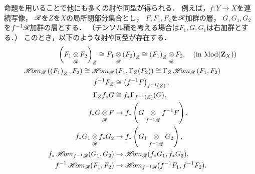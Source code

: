 \begin{RMK}
    命題を用いることで他にも多くの射や同型が得られる．
    例えば，\(f\colon Y\to X\)を連続写像，
    \(\mathscr{R}\)を\(Z\)を\(X\)の局所閉部分集合とし，
    \(F,F_1,F_2\)を\(\mathscr{R}\)加群の層，
    \(G,G_1,G_2\)を\(f^{-1}\mathscr{R}\)加群の層とする．
    （テンソル積を考える場合は\(F_1,G,G_1\)は右加群とする．）
    このとき，以下のような射や同型が存在する．
    \begin{align}
        \left(F_{1}\ttens[\scR]F_{2}\right)_{Z}
        \cong
        F_{1}&\ttens[\scR]\left(F_{2}\right)_{Z}
        \cong
        \left(F_{1}\right)_{Z}\ttens[\scR]F_{2},\quad (\text{in \(\Mod(\zz_X)\)})\label{eq2317}\\
        \HOM_{\scR}\left(\left(F_{1}\right)_{Z},F_{2}\right)
        \cong
        \HOM_{\scR}&\left(F_{1},\Gamma_{Z}(F_{2})\right)
        \cong
        \Gamma_{Z}\HOM_{\scR}\left(F_{1},F_{2}\right)\label{eq2318}\\
        f^{-1}F_{Z}&\cong\left(f^{-1}F\right)_{f^{-1}(Z)},\label{eq2319}\\
        \Gamma_{Z}f_{\ast}G&\cong f_{\ast}\Gamma_{f^{-1}(Z)}(G),\label{eq2320}\\
        f_{\ast}G\ttens[\scR]F&\to f_{\ast}\left(G\ttens[f^{-1}\scR]f^{-1}F\right),\label{eq2321}\\
        f_{\ast}G_{1}\ttens[\scR]f_{\ast}G_{2}&\to f_{\ast}\left(G_{1}\ttens[f^{-1}\scR]G_{2}\right),\label{eq2322}\\
        f_{\ast}\HOM_{f^{-1}\scR}(G_1,G_2)&\to\HOM_{\scR}(f_{\ast}G_1,f_{\ast}G_2),\label{eq2323}\\
        f^{-1}\HOM_{\scR}(F_1,F_2)&\to\HOM_{f^{-1}\scR}(f^{-1}F_1,f^{-1}F_2).\label{eq2324}
    \end{align}
\end{RMK}
